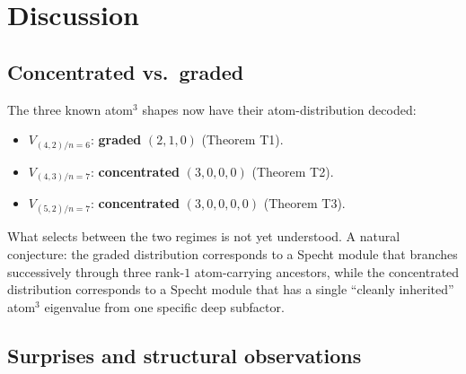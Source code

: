 \documentclass[11pt]{article}
\theoremstyle{plain}
\theoremstyle{definition}
\theoremstyle{remark}
\begin{document}
\section{Discussion}

\subsection{Concentrated vs.\ graded}

The three known atom$^3$ shapes now have their atom-distribution decoded:
\begin{itemize}
\item $V_{(4,2)/n=6}$: \textbf{graded} $(2, 1, 0)$ \quad (Theorem T1).
\item $V_{(4,3)/n=7}$: \textbf{concentrated} $(3, 0, 0, 0)$ \quad (Theorem T2).
\item $V_{(5,2)/n=7}$: \textbf{concentrated} $(3, 0, 0, 0, 0)$ \quad (Theorem T3).
\end{itemize}
What selects between the two regimes is not yet understood.  A natural conjecture:
the graded distribution corresponds to a Specht module that branches successively
through three rank-$1$ atom-carrying ancestors, while the concentrated distribution
corresponds to a Specht module that has a single ``cleanly inherited'' atom$^3$
eigenvalue from one specific deep subfactor.

\subsection{Surprises and structural observations}
\end{document}
